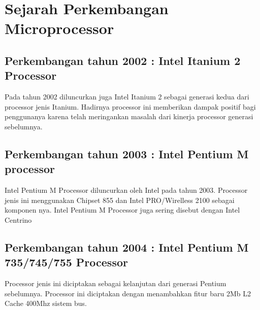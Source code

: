 \section{Sejarah Perkembangan Microprocessor}
\subsection{Perkembangan tahun 2002 : Intel Itanium 2 Processor }
	Pada tahun 2002 diluncurkan juga Intel Itanium 2 sebagai generasi kedua dari processor jenis Itanium. Hadirnya processor ini memberikan dampak positif bagi penggunanya karena telah meringankan masalah dari kinerja processor generasi sebelumnya.
\subsection{Perkembangan tahun 2003 : Intel Pentium M processor}
	Intel Pentium M Processor diluncurkan oleh Intel pada tahun 2003. Processor jenis ini menggunakan Chipset 855 dan Intel PRO/Wirelless 2100 sebagai komponen nya. Intel Pentium M Processor juga sering disebut dengan Intel Centrino
\subsection{Perkembangan tahun 2004 : Intel Pentium M 735/745/755 Processor}
	Processor jenis ini diciptakan sebagai kelanjutan dari generasi Pentium sebelumnya. Processor ini diciptakan dengan menambahkan fitur baru 2Mb L2 Cache 400Mhz sistem bus.